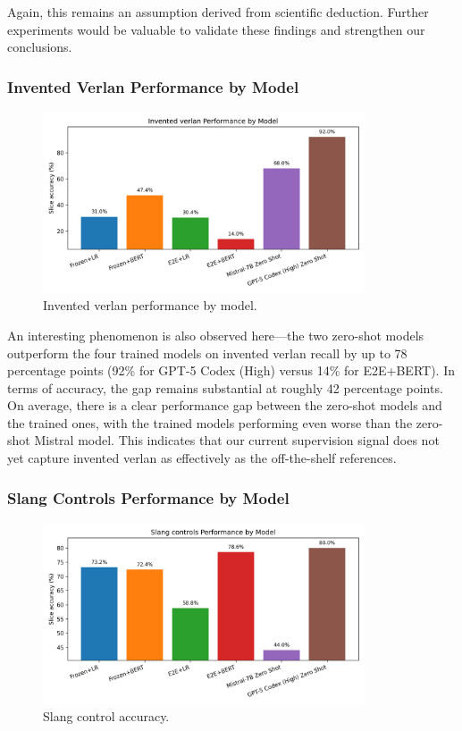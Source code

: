 \documentclass[12pt]{article}
\begin{document}
Again, this remains an assumption derived from scientific deduction. 
Further experiments would be valuable to validate these findings and strengthen our conclusions.

\subsubsection{Invented Verlan Performance by Model}

\begin{figure}[H]
    \centering
    \includegraphics[width=0.85\textwidth]{figures/invented_verlan_comparison.png}
    \caption{Invented verlan performance by model.}
    \label{fig:invented-verlan-comparison}
\end{figure}

An interesting phenomenon is also observed here\;---\;the two zero-shot models outperform the four trained models on invented verlan recall by up to 78 percentage points (92\% for GPT-5 Codex (High) versus 14\% for E2E+BERT). 
In terms of accuracy, the gap remains substantial at roughly 42 percentage points.
On average, there is a clear performance gap between the zero-shot models and the trained ones, with the trained models performing even worse than the zero-shot Mistral model. This indicates that our current supervision signal does not yet capture invented verlan as effectively as the off-the-shelf references.

\subsubsection{Slang Controls Performance by Model}

\begin{figure}[H]
    \centering
    \includegraphics[width=0.85\textwidth]{figures/slang_controls_comparison.png}
    \caption{Slang control accuracy.}
    \label{fig:slang-comparison}
\end{figure}
\end{document}
